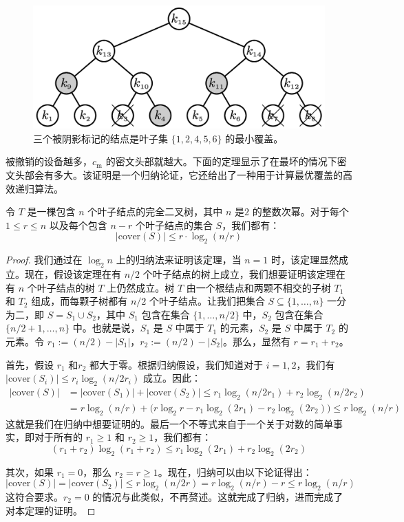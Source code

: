 \begin{figure}
  \centering
  \includegraphics[width=0.45\linewidth]{figures/chapter5/fig6.png}
  \caption{三个被阴影标记的结点是叶子集 $\{1,2,4,5,6\}$ 的最小覆盖。}
  \label{fig:5-6}
\end{figure}

被撤销的设备越多，$c_\mathrm{m}$ 的密文头部就越大。下面的定理显示了在最坏的情况下密文头部会有多大。该证明是一个归纳论证，它还给出了一种用于计算最优覆盖的高效递归算法。

\begin{theorem}\label{theo:5-8}
令 $T$ 是一棵包含 $n$ 个叶子结点的完全二叉树，其中 $n$ 是$2$ 的整数次幂。对于每个 $1\leq r\leq n$ 以及每个包含 $n-r$ 个叶子结点的集合 $S$，我们都有：
\[
|\mathrm{cover}(S)|\leq r\cdot\log_2(n/r)
\]
\end{theorem}

\begin{proof}
我们通过在 $\log_2n$ 上的归纳法来证明该定理，当 $n=1$ 时，该定理显然成立。现在，假设该定理在有 $n/2$ 个叶子结点的树上成立，我们想要证明该定理在有 $n$ 个叶子结点的树 $T$ 上仍然成立。树 $T$ 由一个根结点和两颗不相交的子树 $T_1$ 和 $T_2$ 组成，而每颗子树都有 $n/2$ 个叶子结点。让我们把集合 $S\subseteq\{1,\dots,n\}$ 一分为二，即 $S=S_1\cup S_2$，其中 $S_1$ 包含在集合 $\{1,\dots,n/2\}$ 中，$S_2$ 包含在集合 $\{n/2+1,\dots,n\}$ 中。也就是说，$S_1$ 是 $S$ 中属于 $T_1$ 的元素，$S_2$ 是 $S$ 中属于 $T_2$ 的元素。令 $r_1:=(n/2)-|S_1|$，$r_2:=(n/2)-|S_2|$。那么，显然有 $r=r_1+r_2$。

首先，假设 $r_1$ 和$r_2$ 都大于零。根据归纳假设，我们知道对于 $i=1,2$，我们有 $|\mathrm{cover}(S_i)|\leq r_i\log_2(n/2r_i)$ 成立。因此：
\[
\begin{aligned}
|\mathrm{cover}(S)| & = |\mathrm{cover}(S_1)| + |\mathrm{cover}(S_2)| \leq r_1\log_2(n/2r_1)+r_2\log_2(n/2r_2)\\
& = r\log_2(n/r) + \big(r\log_2r-r_1\log_2(2r_1)-r_2\log_2(2r_2)\big) \leq r\log_2(n/r)
\end{aligned}
\]
这就是我们在归纳中想要证明的。最后一个不等式来自于一个关于对数的简单事实，即对于所有的 $r_1\geq1$ 和 $r_2\geq1$，我们都有：
\[
(r_1+r_2)\log_2(r_1+r_2)\leq r_1\log_2(2r_1)+r_2\log_2(2r_2)
\]

其次，如果 $r_1=0$，那么 $r_2=r\geq1$。现在，归纳可以由以下论证得出：
\[
|\mathrm{cover}(S)| = |\mathrm{cover}(S_2)| \leq r\log_2(n/2r) = r\log_2(n/r)-r \leq r\log_2(n/r)
\]
这符合要求。$r_2=0$ 的情况与此类似，不再赘述。这就完成了归纳，进而完成了对本定理的证明。
\end{proof}

